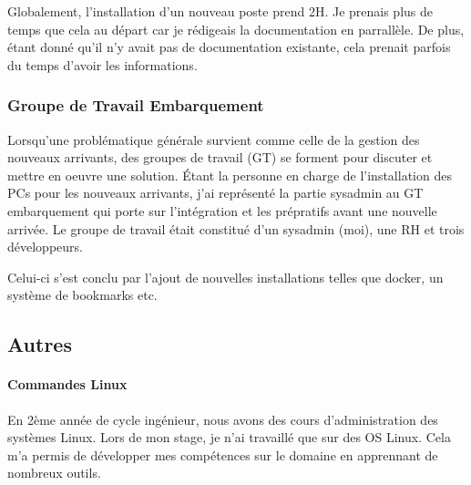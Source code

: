 \documentclass[12pt]{article}
\begin{document}
Globalement, l'installation d'un nouveau poste prend 2H. 
Je prenais plus de temps que cela au départ car je rédigeais la documentation en parrallèle. 
De plus, étant donné qu'il n'y avait pas de documentation existante, cela prenait parfois du temps d'avoir les informations. 

\subsubsection{Groupe de Travail Embarquement}
Lorsqu'une problématique générale survient comme celle de la gestion des nouveaux arrivants, des groupes de travail (GT) se forment pour discuter et mettre en oeuvre une solution.
Étant la personne en charge de l'installation des PCs pour les nouveaux arrivants, j'ai représenté la partie sysadmin au GT embarquement qui porte sur l'intégration et les prépratifs avant une nouvelle arrivée.
Le groupe de travail était constitué d'un sysadmin (moi), une RH et trois développeurs.

Celui-ci s'est conclu par l'ajout de nouvelles installations telles que docker, un système de bookmarks etc.
\newpage
\subsection{Autres}
\paragraph{Commandes \gls{Linux}}
En 2ème année de cycle ingénieur, nous avons des cours d'administration des systèmes \gls{Linux}.
Lors de mon stage, je n'ai travaillé que sur des OS \gls{Linux}.
Cela m'a permis de développer mes compétences sur le domaine en apprennant de nombreux outils.
\end{document}
